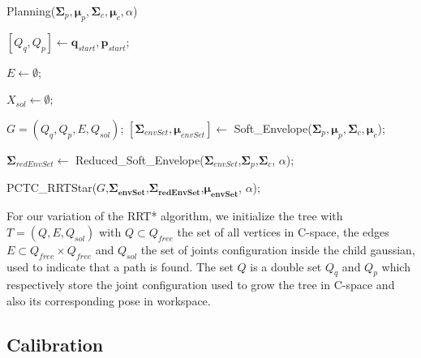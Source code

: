 \documentclass[letterpaper, 10 pt, conference]{ieeeconf}  %
\newcommand{\mb}[1]{{\boldsymbol{#1}}}
\begin{document}
\begin{algorithm}[H]
 \caption{Planning($\mb{\Sigma}_p,\mb{\mu}_p,\mb{\Sigma}_c,\mb{\mu}_c,\alpha$)}\label{planning}

\BlankLine
\setcounter{AlgoLine}{0}
$[Q_q,Q_p] \leftarrow \mb{q}_{start},\mb{p}_{start}$;

$E \leftarrow \emptyset$;

$X_{sol} \leftarrow \emptyset$;

$G=(Q_q,Q_p,E,Q_{sol})$;
\BlankLine
$[\mb{\Sigma}_{envSet},\mb{\mu}_{envSet}] \leftarrow$ Soft\_Envelope($\mb{\Sigma}_p,\mb{\mu}_p,\mb{\Sigma}_c,\mb{\mu}_c$);

$\mb{\Sigma}_{redEnvSet} \leftarrow$ Reduced\_Soft\_Envelope($\mb{\Sigma}_{envSet}$,$\mb{\Sigma}_{p}$,$\mb{\Sigma}_{c}$, $\alpha$);

\BlankLine
PCTC\_RRTStar($G$,$\mb{\Sigma_{envSet}}$,$\mb{\Sigma_{redEnvSet}}$,$\mb{\mu_{envSet}}$, $\alpha$);

\end{algorithm}
For our variation of the RRT* algorithm, we initialize the tree with  $T=(Q,E,Q_{sol})$ with $Q \subset Q_{free}$ the set of all vertices in C-space, the edges $E \subset Q_{free} \times Q_{free}$ and $Q_{sol}$ the set of joints configuration inside the child gaussian, used to indicate that a path is found. The set $Q$ is a double set $Q_q$ and $Q_p$ which respectively store the joint configuration used to grow the tree in C-space and also its corresponding pose in workspace. 

\subsection{Calibration}
\end{document}
